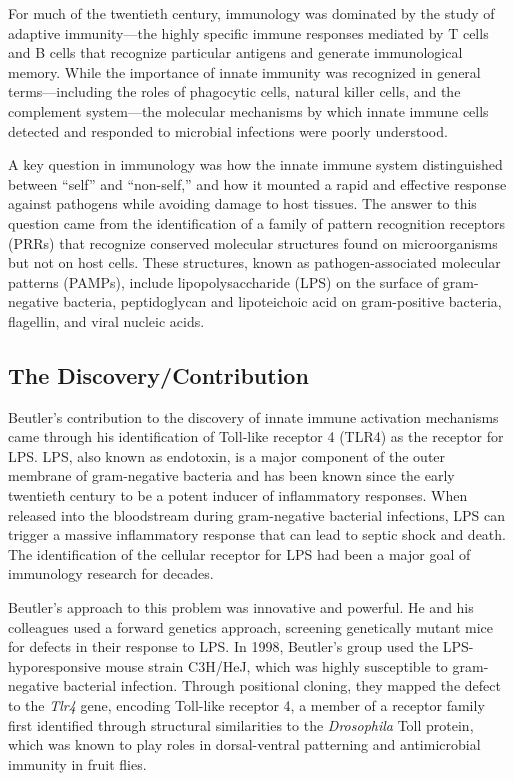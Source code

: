 For much of the twentieth century, immunology was dominated by the study of adaptive immunity---the highly specific immune responses mediated by T cells and B cells that recognize particular antigens and generate immunological memory. While the importance of innate immunity was recognized in general terms---including the roles of phagocytic cells, natural killer cells, and the complement system---the molecular mechanisms by which innate immune cells detected and responded to microbial infections were poorly understood.

A key question in immunology was how the innate immune system distinguished between ``self'' and ``non-self,'' and how it mounted a rapid and effective response against pathogens while avoiding damage to host tissues. The answer to this question came from the identification of a family of pattern recognition receptors (PRRs) that recognize conserved molecular structures found on microorganisms but not on host cells. These structures, known as pathogen-associated molecular patterns (PAMPs), include lipopolysaccharide (LPS) on the surface of gram-negative bacteria, peptidoglycan and lipoteichoic acid on gram-positive bacteria, flagellin, and viral nucleic acids.

\subsection{The Discovery/Contribution}

Beutler's contribution to the discovery of innate immune activation mechanisms came through his identification of Toll-like receptor 4 (TLR4) as the receptor for LPS. LPS, also known as endotoxin, is a major component of the outer membrane of gram-negative bacteria and has been known since the early twentieth century to be a potent inducer of inflammatory responses. When released into the bloodstream during gram-negative bacterial infections, LPS can trigger a massive inflammatory response that can lead to septic shock and death. The identification of the cellular receptor for LPS had been a major goal of immunology research for decades.

Beutler's approach to this problem was innovative and powerful. He and his colleagues used a forward genetics approach, screening genetically mutant mice for defects in their response to LPS. In 1998, Beutler's group used the LPS-hyporesponsive mouse strain C3H/HeJ, which was highly susceptible to gram-negative bacterial infection. Through positional cloning, they mapped the defect to the \textit{Tlr4} gene, encoding Toll-like receptor 4, a member of a receptor family first identified through structural similarities to the \textit{Drosophila} Toll protein, which was known to play roles in dorsal-ventral patterning and antimicrobial immunity in fruit flies.


